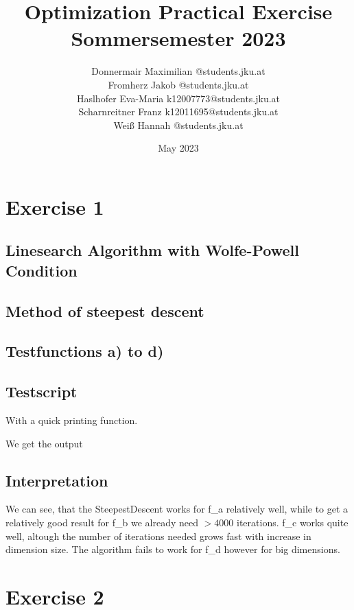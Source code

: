 \documentclass{article}
\title{Optimization Practical Exercise \\ Sommersemester 2023}
\author{Donnermair Maximilian @students.jku.at\\ Fromherz Jakob @students.jku.at\\Haslhofer Eva-Maria  k12007773@students.jku.at \\ Scharnreitner Franz k12011695@students.jku.at\\ Weiß Hannah @students.jku.at } %
\date{May 2023}
\begin{document}
\maketitle

\newpage

\section{Exercise 1}

\subsection{Linesearch Algorithm with Wolfe-Powell Condition}


\subsection{Method of steepest descent}



\subsection{Testfunctions a) to d)}








\subsection{Testscript}


With a quick printing function.


We get the output

\subsection{Interpretation}
We can see, that the SteepestDescent works for f\_a relatively well, while to get a relatively good result for f\_b we already need $>4000$ iterations.
f\_c works quite well, altough the number of iterations needed grows fast with increase in dimension size. The algorithm fails to work for f\_d however for big dimensions.

\newpage
\section{Exercise 2}
\end{document}
